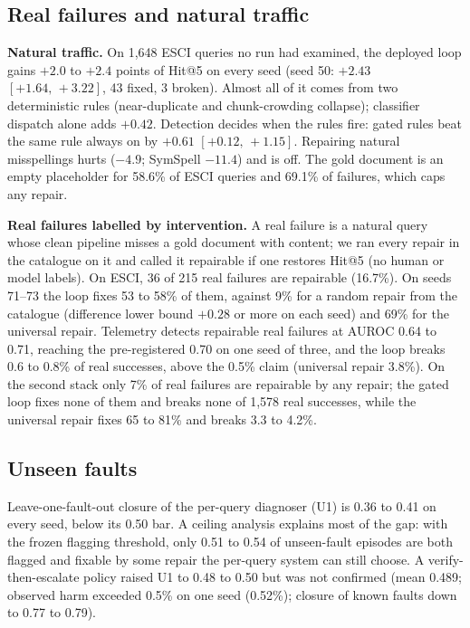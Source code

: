 \documentclass[conference]{IEEEtran}
\newcommand{\ci}[2]{[#1,\,#2]}
\begin{document}
\subsection{Real failures and natural traffic}\label{sec:res-real}
\textbf{Natural traffic.} On 1{,}648 ESCI queries no run had examined, the deployed loop gains $+2.0$ to $+2.4$ points of Hit@5 on every seed (seed 50: $+2.43$ $\ci{+1.64}{+3.22}$, 43 fixed, 3 broken). Almost all of it comes from two deterministic rules (near-duplicate and chunk-crowding collapse); classifier dispatch alone adds $+0.42$. Detection decides when the rules fire: gated rules beat the same rule always on by $+0.61$ $\ci{+0.12}{+1.15}$. Repairing natural misspellings hurts ($-4.9$; SymSpell $-11.4$) and is off. The gold document is an empty placeholder for 58.6\% of ESCI queries and 69.1\% of failures, which caps any repair.

\textbf{Real failures labelled by intervention.} A real failure is a natural query whose clean pipeline misses a gold document with content; we ran every repair in the catalogue on it and called it repairable if one restores Hit@5 (no human or model labels). On ESCI, 36 of 215 real failures are repairable (16.7\%). On seeds 71--73 the loop fixes 53 to 58\% of them, against 9\% for a random repair from the catalogue (difference lower bound $+0.28$ or more on each seed) and 69\% for the universal repair. Telemetry detects repairable real failures at AUROC 0.64 to 0.71, reaching the pre-registered 0.70 on one seed of three, and the loop breaks 0.6 to 0.8\% of real successes, above the 0.5\% claim (universal repair 3.8\%). On the second stack only 7\% of real failures are repairable by any repair; the gated loop fixes none of them and breaks none of 1{,}578 real successes, while the universal repair fixes 65 to 81\% and breaks 3.3 to 4.2\%.

\subsection{Unseen faults}\label{sec:res-u1}
Leave-one-fault-out closure of the per-query diagnoser (U1) is 0.36 to 0.41 on every seed, below its 0.50 bar. A ceiling analysis explains most of the gap: with the frozen flagging threshold, only 0.51 to 0.54 of unseen-fault episodes are both flagged and fixable by some repair the per-query system can still choose. A verify-then-escalate policy raised U1 to 0.48 to 0.50 but was not confirmed (mean 0.489; observed harm exceeded 0.5\% on one seed (0.52\%); closure of known faults down to 0.77 to 0.79).
\end{document}
